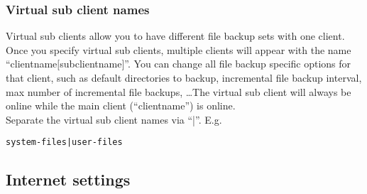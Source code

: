 \documentclass[a4paper,10pt]{article}
\begin{document}
\subsubsection{Virtual sub client names}

Virtual sub clients allow you to have different file backup sets with one client. Once you specify virtual sub clients,
multiple clients will appear with the name ``clientname$[$subclientname$]$''. You can change all file backup specific options for that client, such as default directories to backup, incremental file backup interval, max number of incremental file backups, \ldots The virtual sub client will always be online while the main client (``clientname'') is online.\\

\noindent Separate the virtual sub client names via ``|''. E.g.
\begin{verbatim}
system-files|user-files
\end{verbatim}

\subsection{Internet settings}
\label{internet_settings}
\end{document}
